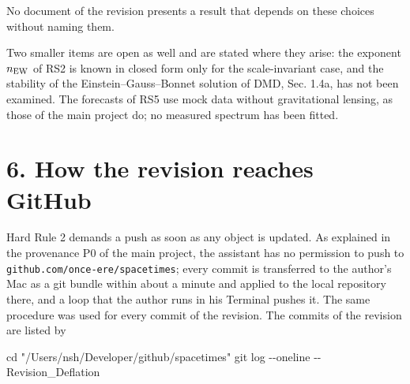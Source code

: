\documentclass[
  10pt,
]{article}
\newenvironment{Shaded}{}{}
\newcommand{\AttributeTok}[1]{\textcolor[rgb]{0.49,0.56,0.16}{#1}}
\newcommand{\BuiltInTok}[1]{\textcolor[rgb]{0.00,0.50,0.00}{#1}}
\newcommand{\FunctionTok}[1]{\textcolor[rgb]{0.02,0.16,0.49}{#1}}
\newcommand{\NormalTok}[1]{#1}
\newcommand{\StringTok}[1]{\textcolor[rgb]{0.25,0.44,0.63}{#1}}
\begin{document}
No document of the revision presents a result that depends on these
choices without naming them.

Two smaller items are open as well and are stated where they arise: the
exponent \(n_{\rm EW}\) of RS2 is known in closed form only for the
scale-invariant case, and the stability of the Einstein--Gauss--Bonnet
solution of DMD, Sec. 1.4a, has not been examined. The forecasts of RS5
use mock data without gravitational lensing, as those of the main
project do; no measured spectrum has been fitted.

\hypertarget{how-the-revision-reaches-github}{%
\section{6. How the revision reaches
GitHub}\label{how-the-revision-reaches-github}}

Hard Rule 2 demands a push as soon as any object is updated. As
explained in the provenance P0 of the main project, the assistant has no
permission to push to \texttt{github.com/once-ere/spacetimes}; every
commit is transferred to the author's Mac as a git bundle within about a
minute and applied to the local repository there, and a loop that the
author runs in his Terminal pushes it. The same procedure was used for
every commit of the revision. The commits of the revision are listed by

\begin{Shaded}
\begin{Highlighting}[]
\BuiltInTok{cd} \StringTok{"/Users/nsh/Developer/github/spacetimes"}
\FunctionTok{git}\NormalTok{ log }\AttributeTok{{-}{-}oneline} \AttributeTok{{-}{-}}\NormalTok{ Revision\_Deflation}
\end{Highlighting}
\end{Shaded}
\end{document}
